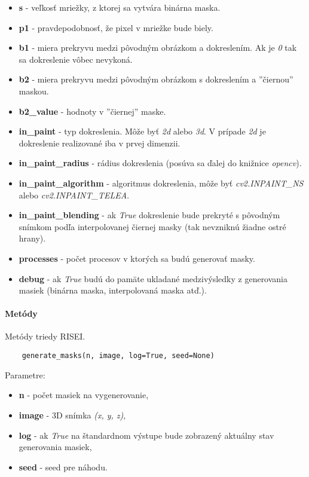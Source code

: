 \begin{itemize}
    \item \textbf{s} - veľkosť mriežky, z ktorej sa vytvára binárna maska.
    \item \textbf{p1} - pravdepodobnosť, že pixel v mriežke bude biely.
    \item \textbf{b1} - miera prekryvu medzi pôvodným obrázkom a dokreslením. Ak je \textit{0} tak sa dokreslenie vôbec nevykoná.
    \item \textbf{b2} - miera prekryvu medzi pôvodným obrázkom s dokreslením a ''čiernou'' maskou. 
    \item \textbf{b2\_value} - hodnoty v ''čiernej'' maske.
    \item \textbf{in\_paint} - typ dokreslenia. Môže byť \textit{2d} alebo \textit{3d}. V prípade \textit{2d} je dokreslenie realizované iba v prvej dimenzii.
    \item \textbf{in\_paint\_radius} - rádius dokreslenia (posúva sa ďalej do knižnice \textit{opencv}).
    \item \textbf{in\_paint\_algorithm} - algoritmus dokreslenia, môže byť \textit{cv2.INPAINT\_NS} alebo \textit{cv2.INPAINT\_TELEA}.
    \item \textbf{in\_paint\_blending} - ak \textit{True} dokreslenie bude prekryté s pôvodným snímkom podľa interpolovanej čiernej masky (tak nevzniknú žiadne ostré hrany).
    \item \textbf{processes} - počet procesov v ktorých sa budú generovať masky.
    \item \textbf{debug} - ak \textit{True} budú do pamäte ukladané medzivýsledky z generovania masiek (binárna maska, interpolovaná maska atď.).
\end{itemize}

\paragraph{Metódy}

Metódy triedy RISEI.

\vspace{8pt}
\begin{lstlisting}
    generate_masks(n, image, log=True, seed=None)
\end{lstlisting}

Parametre:
\begin{itemize}
    \item \textbf{n} - počet masiek na vygenerovanie,
    \item \textbf{image} - 3D snímka \textit{(x, y, z)},
    \item \textbf{log} - ak \textit{True} na štandardnom výstupe bude zobrazený aktuálny stav generovania masiek,
    \item \textbf{seed} - seed pre náhodu.
\end{itemize}

